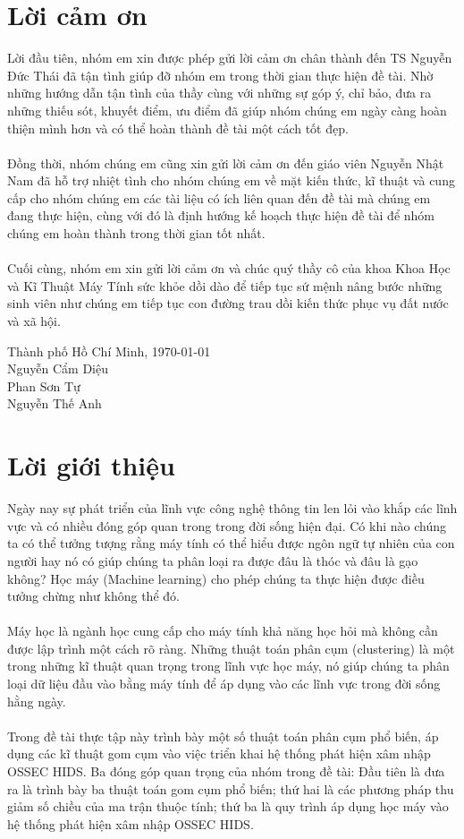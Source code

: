 \section*{Lời cảm ơn}
\thispagestyle{plain} 
Lời đầu tiên, nhóm em xin được phép gửi lời cảm ơn chân thành đến TS
Nguyễn Đức Thái đã tận tình giúp đỡ nhóm em trong thời gian thực hiện đề tài.
Nhờ những hướng dẫn tận tình của thầy cùng với những sự góp ý, chỉ bảo, đưa ra
những thiếu sót, khuyết điểm, ưu điểm đã giúp nhóm chúng em ngày càng hoàn thiện
mình hơn và có thể hoàn thành đề tài một cách tốt đẹp.\\\\
 Đồng thời, nhóm chúng
em cũng xin gửi lời cảm ơn đến giáo viên Nguyễn Nhật Nam đã hỗ trợ nhiệt tình
cho nhóm chúng em về mặt kiến thức, kĩ thuật và cung cấp cho nhóm chúng em các
tài liệu có ích liên quan đến đề tài mà chúng em đang thực hiện, cùng với đó là
định hướng kế hoạch thực hiện đề tài để nhóm chúng em hoàn thành trong thời gian
tốt nhất.\\\\
 Cuối cùng, nhóm em xin gửi lời cảm ơn và chúc quý thầy cô của khoa Khoa Học và
 Kĩ Thuật Máy Tính sức khỏe dồi dào để tiếp tục sứ mệnh nâng bước những sinh
 viên như chúng em tiếp tục con đường trau dồi kiến thức phục vụ đất nước và xã
 hội.
 \begin{flushright}
 Thành phố Hồ Chí Minh, \today\\ 
Nguyễn Cẩm Diệu\\
Phan Sơn Tự\\
Nguyễn Thế Anh\\
 \end{flushright}
\pagebreak

\section*{Lời giới thiệu}
\thispagestyle{plain} 
Ngày nay sự phát triển của lĩnh vực công nghệ thông tin len lỏi vào khắp các
lĩnh vực và có nhiều đóng góp quan trong trong đời sống hiện đại. Có khi nào
chúng ta có thể tưởng tượng rằng máy tính có thể hiểu được ngôn ngữ tự nhiên
của con người hay nó có giúp chúng ta phân loại ra được đâu là thóc và đâu là
gạo không? Học máy (Machine learning) cho phép chúng ta thực hiện được điều
tưởng chừng như không thể đó.\\\\
Máy học là ngành học cung cấp cho máy tính khả
năng học hỏi mà không cần được lập trình một cách rõ ràng. Những thuật toán phân
cụm (clustering) là một trong những kĩ thuật quan trọng trong lĩnh vực học máy,
nó giúp chúng ta phân loại dữ liệu đầu vào bằng máy tính để áp dụng vào các
lĩnh vực trong đời sống hằng ngày.\\\\
Trong đề tài thực tập này trình bày một số thuật toán phân cụm phổ biến, áp dụng
các kĩ thuật gom cụm vào việc triển khai hệ thống phát hiện xâm nhập OSSEC HIDS.
Ba đóng góp quan trọng của nhóm trong đề tài: Đầu tiên là đưa ra là trình bày ba
thuật toán gom cụm phổ biến; thứ hai là các phương pháp thu giảm số chiều của ma
trận thuộc tính; thứ ba là quy trình áp dụng học máy vào hệ thống phát hiện xâm
nhập OSSEC HIDS.
\pagebreak